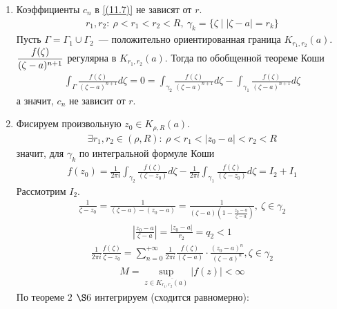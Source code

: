 \pr
\begin{enumerate}
    \item Коэффициенты $c_n$ в \eqref{(11.7)} не зависят от $r$.
    \begin{align*}
      r_1,r_2: \ \rho < r_1 < r_2 < R, \ \gamma_k = \{\zeta \mid \left| \zeta - a \right| = r_k\}
    \end{align*}
    Пусть $\Gamma = \Gamma_1 \cup \Gamma_2$~--- положительно ориентированная
    граница $K_{r_1,r_2}(a)$.
    \\
    $\displaystyle \frac{f(\zeta)}{(\zeta - a)^{n+1}}$ регулярна в $K_{r_1,r_2}(a)$.
    Тогда по обобщенной теореме Коши
    \begin{align*}
      \int_{\Gamma} \frac{f(\zeta)}{(\zeta - a)^{n+1}}d\zeta = 0 = \int_{\gamma_2} \frac{f(\zeta)}{(\zeta - a)^{n+1}}d\zeta - \int_{\gamma_1} \frac{f(\zeta)}{(\zeta - a)^{n+1}}d\zeta
    \end{align*}
    а значит, $c_n$ не зависит от $r$.
    \item Фисируем произвольную $z_0 \in K_{\rho,R}(a)$.
    \begin{align*}
      \exists r_1, r_2 \in (\rho,R): \ \rho < r_1 < \left| z_0-a \right|<r_2<R 
    \end{align*}
    значит, для $\gamma_k$ по интегральной формуле Коши
    \begin{align*}
      f(z_0) = \frac{1}{2\pi i}\int_{\gamma_2} \frac{f(\zeta)}{(\zeta - z_0)}d\zeta - \frac{1}{2\pi i}\int_{\gamma_1} \frac{f(\zeta)}{(\zeta - z_0)}d\zeta = I_2 + I_1
    \end{align*}
    Рассмотрим $I_2$.
    \begin{align*}
      \frac{1}{\zeta - z_0} = \frac{1}{(\zeta - a) - (z_0-a)} = \frac{1}{(\zeta - a)\left( 1 - \frac{z_0-a}{\zeta-a} \right)}, \ \zeta \in \gamma_2
    \end{align*}
    \begin{align*}
      \left| \frac{z_0-a}{\zeta - a} \right| = \frac{\left| z_0-a \right|}{r_2} = q_2 < 1
    \end{align*}
    \begin{align*}
      \frac{1}{2 \pi i}\frac{f(\zeta)}{\zeta - z_0} = \sum_{n=0}^{+\infty}\frac{1}{2\pi i}\frac{f(\zeta)}{(\zeta - a)} \cdot \frac{(z_0-a)^n}{(\zeta - a)^n}, \zeta \in \gamma_2
    \end{align*}
    \begin{align*}
      M = \sup_{z \in \overline{K_{r_1,r_2}(a)}}\left| f(z) \right|< \infty
    \end{align*}
    По теореме $2$ $\S 6$ интегрируем (сходится равномерно):

\end{enumerate}

